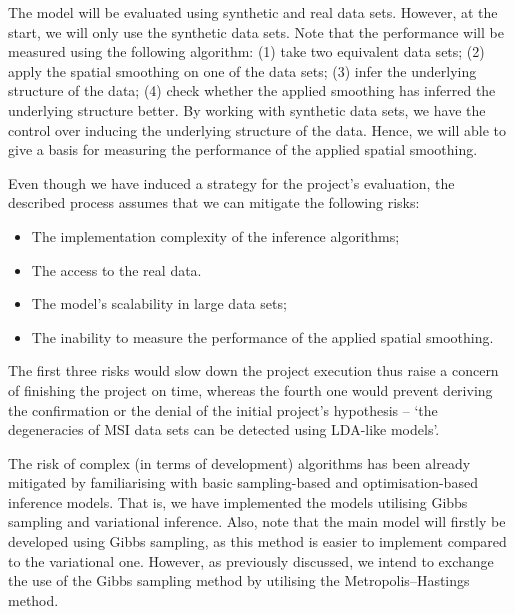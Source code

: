 \documentclass{mprop}
\begin{document}
% 
\par The model will be evaluated using synthetic and real data sets. However, at the start, we will only use the synthetic data sets. Note that the performance will be measured using the following algorithm: (1) take two equivalent data sets; (2) apply the spatial smoothing on one of the data sets; (3) infer the underlying structure of the data; (4) check whether the applied smoothing has inferred the underlying structure better. By working with synthetic data sets, we have the control over inducing the underlying structure of the data. Hence, we will able to give a basis for measuring the performance of the applied spatial smoothing. 

\par Even though we have induced a strategy for the project's evaluation, the described process assumes that we can mitigate the following risks:
\begin{itemize}
  \item The implementation complexity of the inference algorithms;
  \item The access to the real data.
  \item The model's scalability in large data sets;
  \item The inability to measure the performance of the applied spatial smoothing.
\end{itemize}
The first three risks would slow down the project execution thus raise a concern of finishing the project on time, whereas the fourth one would prevent deriving the confirmation or the denial of the initial project's hypothesis -- `the degeneracies of MSI data sets can be detected using LDA-like models'. 

\par The risk of complex (in terms of development) algorithms has been already mitigated by familiarising with basic sampling-based and optimisation-based inference models. That is, we have implemented the models utilising Gibbs sampling and variational inference. Also, note that the main model will firstly be developed using Gibbs sampling, as this method is easier to implement compared to the variational one. However, as previously discussed, we intend to exchange the use of the Gibbs sampling method by utilising the Metropolis--Hastings method. 
\end{document}

